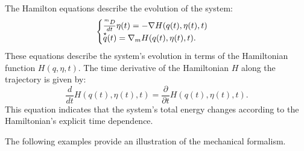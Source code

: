\documentclass[axioms,article,submit,pdftex,moreauthors]{Definitions/mdpi}
\theoremstyle{plain}
\theoremstyle{remark}
\newcommand{\mDerivby}[1]{\frac{\prescript{m}{}D}{d#1}}
\begin{document}
The Hamilton equations describe the evolution of the system:
\begin{equation*} 
\begin{cases}
\mDerivby t \eta(t) = -\nabla H(q(t), \eta(t), t) \\
\overset{\star}{q}(t) = \nabla_m H(q(t), \eta(t), t).
\end{cases}
\end{equation*} 
These equations describe the system's evolution in terms of the Hamiltonian function \( H(q, \eta, t) \). The time derivative of the Hamiltonian \( H \) along the trajectory is given by:
\begin{equation*} 
\frac{d}{dt} H(q(t), \eta(t), t) = \frac{\partial}{\partial t} H(q(t), \eta(t), t).
\end{equation*} 
This equation indicates that the system's total energy changes according to the Hamiltonian's explicit time dependence.

The following examples provide an illustration of the mechanical formalism.
\end{document}
